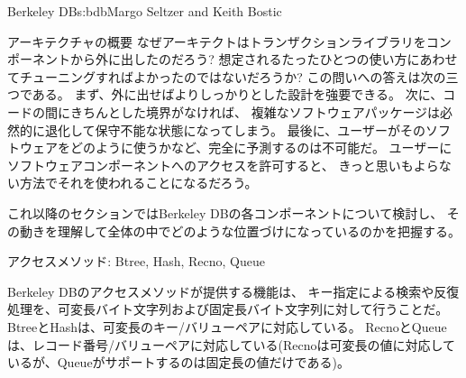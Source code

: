 \begin{aosachapter}{Berkeley DB}{s:bdb}{Margo Seltzer and Keith Bostic}
\begin{aosasect1}{アーキテクチャの概要}
なぜアーキテクトはトランザクションライブラリをコンポーネントから外に出したのだろう?
想定されるたったひとつの使い方にあわせてチューニングすればよかったのではないだろうか?
この問いへの答えは次の三つである。
まず、外に出せばよりしっかりとした設計を強要できる。
次に、コードの間にきちんとした境界がなければ、
複雑なソフトウェアパッケージは必然的に退化して保守不能な状態になってしまう。
最後に、ユーザーがそのソフトウェアをどのように使うかなど、完全に予測するのは不可能だ。
ユーザーにソフトウェアコンポーネントへのアクセスを許可すると、
きっと思いもよらない方法でそれを使われることになるだろう。

これ以降のセクションではBerkeley DBの各コンポーネントについて検討し、
その動きを理解して全体の中でどのような位置づけになっているのかを把握する。

\end{aosasect1}

\begin{aosasect1}{アクセスメソッド: Btree, Hash, Recno, Queue}

Berkeley DBのアクセスメソッドが提供する機能は、
キー指定による検索や反復処理を、可変長バイト文字列および固定長バイト文字列に対して行うことだ。
BtreeとHashは、可変長のキー/バリューペアに対応している。
RecnoとQueueは、レコード番号/バリューペアに対応している(Recnoは可変長の値に対応しているが、Queueがサポートするのは固定長の値だけである)。



\end{aosasect1}
\end{aosachapter}
